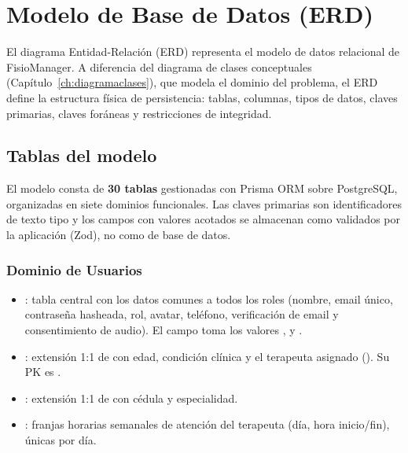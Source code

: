 
\chapter{Modelo de Base de Datos (ERD)}\label{ch:modeloerd}

El diagrama Entidad-Relación (ERD) representa el modelo de datos relacional de FisioManager. A diferencia del diagrama de clases conceptuales (Capítulo~\ref{ch:diagramaclases}), que modela el dominio del problema, el ERD define la estructura física de persistencia: tablas, columnas, tipos de datos, claves primarias, claves foráneas y restricciones de integridad.

\section{Tablas del modelo}

El modelo consta de \textbf{30 tablas} gestionadas con Prisma ORM sobre PostgreSQL, organizadas en siete dominios funcionales. Las claves primarias son identificadores de texto tipo  y los campos con valores acotados se almacenan como  validados por la aplicación (Zod), no como  de base de datos.

\subsection{Dominio de Usuarios}

\begin{itemize}
  \item {}: tabla central con los datos comunes a todos los roles (nombre, email único, contraseña hasheada, rol, avatar, teléfono, verificación de email y consentimiento de audio). El campo  toma los valores ,  y .

  \item {}: extensión 1:1 de  con edad, condición clínica y el terapeuta asignado (). Su PK es .

  \item {}: extensión 1:1 de  con cédula y especialidad.

  \item {}: franjas horarias semanales de atención del terapeuta (día, hora inicio/fin), únicas por día.
\end{itemize}

